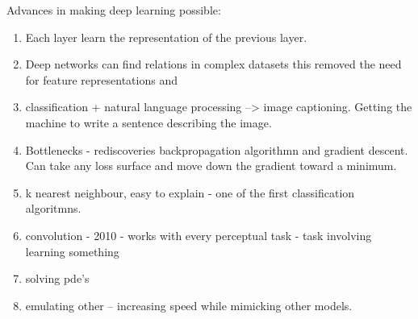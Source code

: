 Advances in making deep learning possible:
\begin{enumerate}
    \item Each layer learn the representation of the previous layer. 
    \item Deep networks can find relations in complex datasets this removed the need for feature representations and 
    \item classification + natural language processing --> image captioning. Getting the machine to write a sentence describing the image.
    \item Bottlenecks - rediscoveries backpropagation algorithmn and gradient descent. Can take any loss surface and move down the gradient toward a minimum. 
    \item k nearest neighbour, easy to explain - one of the first classification algoritmns.
    \item convolution - 2010 - works with every perceptual task - task involving learning something 
    \item solving pde's
    \item emulating other -- increasing speed while mimicking other models.
\end{enumerate}

